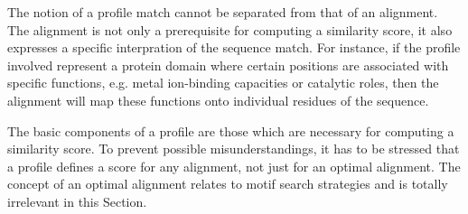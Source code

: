 \documentclass[a4paper,10pt,twoside]{scrartcl}
\begin{document}
  The notion of a profile match cannot be separated from that of an alignment. The alignment is not only a prerequisite for computing a similarity
  score, it also expresses a specific interpration of the sequence match.
  For instance, if the profile involved represent a protein domain where certain positions are associated with specific functions, e.g.  metal
  ion-binding capacities or catalytic roles, then the alignment will map these functions onto individual residues of the sequence.

  The basic components of a profile are those which are necessary for computing a similarity score. To prevent possible misunderstandings, it has
  to be stressed that a profile defines a score for any alignment, not just for an optimal alignment. The concept of an optimal alignment relates to
  motif search strategies and is totally irrelevant in this Section.
\end{document}

